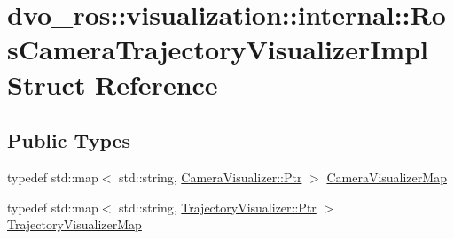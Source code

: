 \hypertarget{structdvo__ros_1_1visualization_1_1internal_1_1_ros_camera_trajectory_visualizer_impl}{}\section{dvo\+\_\+ros\+:\+:visualization\+:\+:internal\+:\+:Ros\+Camera\+Trajectory\+Visualizer\+Impl Struct Reference}
\label{structdvo__ros_1_1visualization_1_1internal_1_1_ros_camera_trajectory_visualizer_impl}
\subsection*{Public Types}
\begin{DoxyCompactItemize}
\item 
typedef std\+::map$<$ std\+::string, \mbox{\hyperlink{classdvo_1_1visualization_1_1_camera_visualizer_a473ebecc62e1d4edba21027d858789a2}{Camera\+Visualizer\+::\+Ptr}} $>$ \mbox{\hyperlink{structdvo__ros_1_1visualization_1_1internal_1_1_ros_camera_trajectory_visualizer_impl_a9eafaee3bd7de4182a58c268cab6d86d}{Camera\+Visualizer\+Map}}
\item 
typedef std\+::map$<$ std\+::string, \mbox{\hyperlink{classdvo_1_1visualization_1_1_trajectory_visualizer_aac33ef5979fe64ee33409f1afa977fd3}{Trajectory\+Visualizer\+::\+Ptr}} $>$ \mbox{\hyperlink{structdvo__ros_1_1visualization_1_1internal_1_1_ros_camera_trajectory_visualizer_impl_a39e2bcdbb593f2f60778e908dda9b0cd}{Trajectory\+Visualizer\+Map}}
\end{DoxyCompactItemize}
